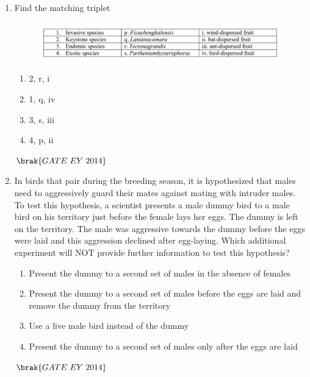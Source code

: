 \documentclass[journal]{IEEEtran}
\numberwithin{equation}{enumi}
\numberwithin{figure}{enumi}
\begin{document}
\begin{enumerate}
    \item Find the matching triplet
    \begin{figure}[H]
    \centering
    \includegraphics[width=0.8\columnwidth]{figs/10.png}
    \caption{}
    \label{fig:10}
   \end{figure}
    \begin{multicols}{2}
    \begin{enumerate}
        \item 2, r, i
        \item 1, q, iv
        \item 3, s, iii
        \item 4, p, ii
    \end{enumerate}
    \end{multicols}
    \hfill{$\brak{ GATE\ EY\ 2014}$}
    \bigskip
    
\item In birds that pair during the breeding season, it is hypothesized that males need to aggressively guard their mates against mating with intruder males. To test this hypothesis, a scientist presents a male dummy bird to a male bird on his territory just before the female lays her eggs. The dummy is left on the territory. The male was aggressive towards the dummy before the eggs were laid and this aggression declined after egg-laying. Which additional experiment will NOT provide further information to test this hypothesis?
    \begin{enumerate}
        \item Present the dummy to a second set of males in the absence of females
        \item Present the dummy to a second set of males before the eggs are laid and remove the dummy from the territory
        \item Use a live male bird instead of the dummy
        \item Present the dummy to a second set of males only after the eggs are laid
    \end{enumerate}
    \hfill{$\brak{ GATE\ EY\ 2014}$}
    \bigskip


\end{enumerate}
\end{document}
